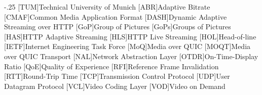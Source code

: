 \documentclass[headsepline,footsepline,footinclude=false,oneside,fontsize=11pt,paper=a4,listof=totoc,bibliography=totoc]{scrbook} %
\begin{document}
% 

\frontmatter{}

% 
% 
% 

\tableofcontents{}

\mainmatter{}






% 


\appendix{}


\begin{acronym}
	\itemsep-.25\baselineskip
	[TUM]{Technical University of Munich}
    [ABR]{Adaptive Bitrate}
	[CMAF]{Common Media Application Format}
	[DASH]{Dynamic Adaptive Streaming over HTTP}
	[GoP]{Group of Pictures}
	[GoPs]{Groups of Pictures}
	[HAS]{HTTP Adaptive Streaming}
	[HLS]{HTTP Live Streaming}
	[HOL]{Head-of-line}
	[IETF]{Internet Engineering Task Force}
	[MoQ]{Media over QUIC}
	[MOQT]{Media over QUIC Transport}
	[NAL]{Network Abstraction Layer}
	[OTDR]{On-Time-Display Ratio}
	[QoE]{Quality of Experience}
	[RFI]{Reference Frame Invalidation}
	[RTT]{Round-Trip Time}
	[TCP]{Transmission Control Protocol}
	[UDP]{User Datagram Protocol}
	[VCL]{Video Coding Layer}
	[VOD]{Video on Demand}
\end{acronym}

\listoffigures{}
\printbibliography{}
\end{document}
